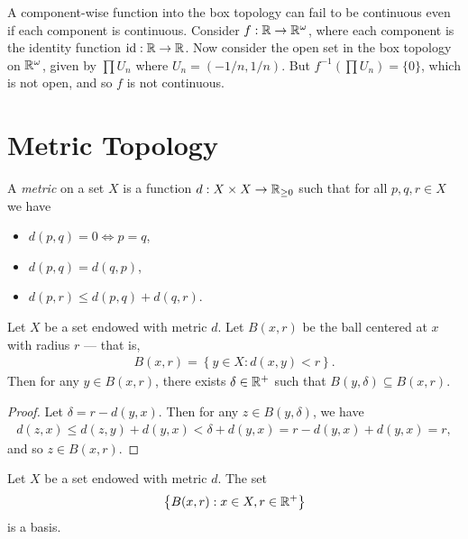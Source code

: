 \begin{rmk}
    A component-wise function into the box topology can fail to be continuous even if each component is continuous. Consider $f: \mathbb{R} \to \mathbb{R}^{\omega}$, where each component is the identity function $\textrm{id}: \mathbb{R} \to \mathbb{R}$. Now consider the open set in the box topology on $\mathbb{R}^{\omega}$, given by $\prod U_{n}$ where $U_n = (-1/n, 1/n)$. But $f^{-1}(\prod U_n) = \{0\}$, which is not open, and so $f$ is not continuous.
\end{rmk}

\section{Metric Topology}

\begin{defn}
    A \emph{metric} on a set $X$ is a function $d: X \times X \to \mathbb{R}_{\geq 0}$ such that for all $p, q, r \in X$ we have
    \begin{itemize}
        \item $d(p, q) = 0 \iff p = q$,
        \item $d(p, q) = d(q, p)$,
        \item $d(p, r) \leq d(p, q) + d(q, r)$.
    \end{itemize}
\end{defn}

\begin{lemma}\label{lemma:inner-ball}
    Let $X$ be a set endowed with metric $d$. Let $B(x, r)$ be the ball centered at $x$ with radius $r$ --- that is,
    \begin{align*}
        B(x, r) = \left\{y \in X : d(x, y) < r\right\}.
    \end{align*}
    Then for any $y \in B(x, r)$, there exists $\delta \in \mathbb{R}^+$ such that $B(y, \delta) \subseteq B(x, r)$.
\end{lemma}

\begin{proof}
    Let $\delta = r - d(y, x)$. Then for any $z \in B(y, \delta)$, we have
    \begin{align*}
        d(z, x) \leq d(z, y) + d(y, x) < \delta + d(y, x) = r - d(y, x) + d(y, x) = r,
    \end{align*}
    and so $z \in B(x, r)$.
\end{proof}

\begin{lemma}
    Let $X$ be a set endowed with metric $d$. The set
    \begin{align*}
        \left\{B(x, r) : x \in X, r \in \mathbb{R}^{+}\right\}
    \end{align*}
    is a basis.
\end{lemma}

